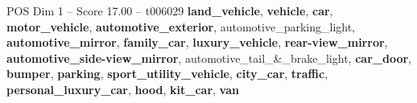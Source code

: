 \begin{textsample}{POS Dim 1 – Score 17.00 – t006029}  \label{ex:f1_pos_040}
\textbf{land\_vehicle}, \textbf{vehicle}, \textbf{car}, \textbf{motor\_vehicle}, \textbf{automotive\_exterior}, automotive\_parking\_light, \textbf{automotive\_mirror}, \textbf{family\_car}, \textbf{luxury\_vehicle}, \textbf{rear-view\_mirror}, \textbf{automotive\_side-view\_mirror}, automotive\_tail\_\&\_brake\_light, \textbf{car\_door}, \textbf{bumper}, \textbf{parking}, \textbf{sport\_utility\_vehicle}, \textbf{city\_car}, \textbf{traffic}, \textbf{personal\_luxury\_car}, \textbf{hood}, \textbf{kit\_car}, \textbf{van}

\end{textsample}
